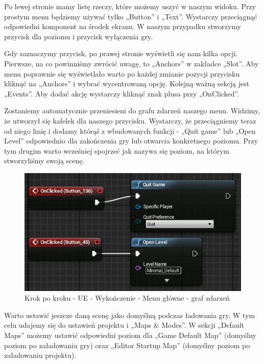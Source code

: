 \documentclass[12pt]{xmgr}
\begin{document}
Po lewej stronie mamy listę rzeczy, które możemy uszyć w naszym widoku. Przy prostym menu będziemy używać tylko „Button” i „Text”. Wystarczy przeciągnąć odpowiedni komponent na środek ekranu. W naszym przypadku stworzymy przycisk dla poziomu i przycisk wyłączenia gry.

Gdy zaznaczymy przycisk, po prawej stronie wyświetli się nam kilka opcji. Pierwsze, na co powinniśmy zwrócić uwagę, to „Anchors” w zakładce „Slot”. Aby menu poprawnie się wyświetlało warto po każdej zmianie pozycji przycisku kliknąć na „Anchors” i wybrać wycentrowaną opcję. Kolejną ważną sekcją jest „Events”. Aby dodać akcję wystarczy kliknąć znak plusa przy „OnClicked”.

Zostaniemy automatycznie przeniesieni do grafu zdarzeń naszego menu. Widzimy, że utworzył się kafelek dla naszego przycisku. Wystarczy, że przeciągniemy teraz od niego linię i dodamy którąś z wbudowanych funkcji - „Quit game” lub „Open Level” odpowiednio dla zakończenia gry lub otwarcia konkretnego poziomu. Przy tym drugim warto wcześniej spojrzeć jak nazywa się poziom, na którym stworzyliśmy swoją scenę.

\begin{figure}[!htb]
    \begin{center}
    \includegraphics[scale=0.5]{Screeny/UeKrokPoKroku/MainMenuEvent}
    \end{center}
    \caption{Krok po kroku - UE - Wykończenie - Menu główne - graf zdarzeń}
\end{figure}

Warto ustawić jeszcze daną scenę jako domyślną podczas ładowania gry. W tym celu udajemy się do ustawień projektu i „Maps \& Modes”. W sekcji „Default Maps” możemy ustawić odpowiedni poziom dla „Game Default Map” (domyślny poziom po załadowaniu gry) oraz „Editor Startup Map” (domyślny poziom po załadowaniu projektu).
\end{document}
